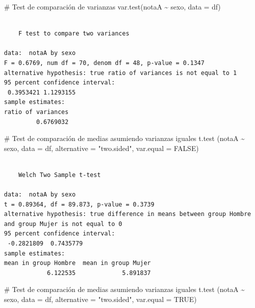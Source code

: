 \documentclass[
  spanish,
  a4paper,
]{scrreport}
\newenvironment{Shaded}{\begin{snugshade}}{\end{snugshade}}
\newcommand{\AttributeTok}[1]{\textcolor[rgb]{0.40,0.45,0.13}{#1}}
\newcommand{\CommentTok}[1]{\textcolor[rgb]{0.37,0.37,0.37}{#1}}
\newcommand{\ConstantTok}[1]{\textcolor[rgb]{0.56,0.35,0.01}{#1}}
\newcommand{\FunctionTok}[1]{\textcolor[rgb]{0.28,0.35,0.67}{#1}}
\newcommand{\NormalTok}[1]{\textcolor[rgb]{0.00,0.23,0.31}{#1}}
\newcommand{\SpecialCharTok}[1]{\textcolor[rgb]{0.37,0.37,0.37}{#1}}
\newcommand{\StringTok}[1]{\textcolor[rgb]{0.13,0.47,0.30}{#1}}
\theoremstyle{definition}
\theoremstyle{definition}
\theoremstyle{remark}
\begin{document}
\begin{Shaded}
\begin{Highlighting}[]
\CommentTok{\# Test de comparación de varianzas}
\FunctionTok{var.test}\NormalTok{(notaA }\SpecialCharTok{\textasciitilde{}}\NormalTok{ sexo, }\AttributeTok{data =}\NormalTok{ df)}
\end{Highlighting}
\end{Shaded}

\begin{verbatim}

    F test to compare two variances

data:  notaA by sexo
F = 0.6769, num df = 70, denom df = 48, p-value = 0.1347
alternative hypothesis: true ratio of variances is not equal to 1
95 percent confidence interval:
 0.3953421 1.1293155
sample estimates:
ratio of variances 
         0.6769032 
\end{verbatim}

\begin{Shaded}
\begin{Highlighting}[]
\CommentTok{\# Test de comparación de medias asumiendo varianzas iguales}
\FunctionTok{t.test}\NormalTok{ (notaA }\SpecialCharTok{\textasciitilde{}}\NormalTok{ sexo, }\AttributeTok{data =}\NormalTok{ df, }\AttributeTok{alternative =} \StringTok{"two.sided"}\NormalTok{, }\AttributeTok{var.equal =} \ConstantTok{FALSE}\NormalTok{)}
\end{Highlighting}
\end{Shaded}

\begin{verbatim}

    Welch Two Sample t-test

data:  notaA by sexo
t = 0.89364, df = 89.873, p-value = 0.3739
alternative hypothesis: true difference in means between group Hombre and group Mujer is not equal to 0
95 percent confidence interval:
 -0.2821809  0.7435779
sample estimates:
mean in group Hombre  mean in group Mujer 
            6.122535             5.891837 
\end{verbatim}

\begin{Shaded}
\begin{Highlighting}[]
\CommentTok{\# Test de comparación de medias asumiendo varianzas iguales}
\FunctionTok{t.test}\NormalTok{ (notaA }\SpecialCharTok{\textasciitilde{}}\NormalTok{ sexo, }\AttributeTok{data =}\NormalTok{ df, }\AttributeTok{alternative =} \StringTok{"two.sided"}\NormalTok{, }\AttributeTok{var.equal =} \ConstantTok{TRUE}\NormalTok{)}
\end{Highlighting}
\end{Shaded}
\end{document}
